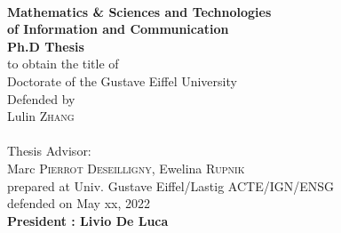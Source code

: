 \begin{titlepage}
\begin{center}
	
\vspace*{0.3cm}
 \\
\noindent \textbf{Mathematics \& Sciences and Technologies\\of Information and Communication} \\
\vspace*{0.5cm}
\noindent \Huge \textbf{Ph.D Thesis} \\
\vspace*{0.3cm}
\noindent \large {to obtain the title of} \\
\vspace*{0.3cm}
\noindent \Large Doctorate of the Gustave Eiffel University \\
\vspace*{0.4cm}
\noindent \large {Defended by\\}
\noindent \huge Lulin \textsc{Zhang} \\
\vspace*{0.8cm}
 \\
\vspace*{0.8cm}
\noindent \Large Thesis Advisor: \\
Marc \textsc{Pierrot Deseilligny}, Ewelina \textsc{Rupnik}\\
\vspace*{0.2cm}
\noindent \Large prepared at Univ. Gustave Eiffel/Lastig ACTE/IGN/ENSG\\
\vspace*{0.2cm}
\noindent \large defended on May xx, 2022 \\
\vspace*{0.5cm}
\noindent \large \textbf{President : Livio De Luca} \\
\end{center}


\end{titlepage}
